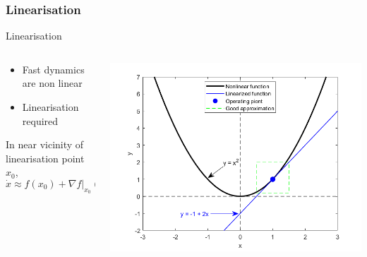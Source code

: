 \subsubsection{Linearisation}
\begin{frame}{Linearisation}
	\begin{columns}
		\begin{column}{.4\textwidth}
			\begin{itemize}
				\item Fast dynamics are non linear
				\item Linearisation required
			\end{itemize}
			In near vicinity of linearisation point $ x_0 $,
			\begin{equation*}
				\dot{x} \approx f(x_0) + \nabla f\bigg\rvert_{x_0} (x-x_0)
			\end{equation*}
		\end{column}
		\begin{column}{.6\textwidth}\raggedleft
			\includegraphics[width=1\linewidth]{Topics/SlowDynamicsLinearisation/Graphics/Linearisation_pic.png}
		\end{column}
	\end{columns}
\end{frame}

